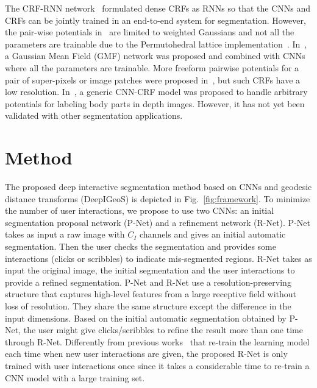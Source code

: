 \documentclass[10pt,journal,compsoc]{IEEEtran}
\begin{document}
The CRF-RNN network~\cite{Zheng2015a} formulated dense CRFs as RNNs so that the CNNs and CRFs can be jointly trained in an end-to-end system for segmentation. However, the pair-wise potentials in~\cite{Zheng2015a} are limited to weighted Gaussians and not all the parameters are trainable due to the Permutohedral lattice implementation~\cite{Adams2010}. In~\cite{Vemulapalli2016}, a Gaussian Mean Field (GMF) network was proposed and combined with CNNs where all the parameters are trainable. More freeform pairwise potentials for a pair of super-pixels or image patches were proposed in~\cite{Liu2014,Lin2016cvpr_efficient}, but such CRFs have a low resolution. In~\cite{Kirillov2016}, a generic CNN-CRF model was proposed to handle arbitrary potentials for labeling body parts in depth images. However, it has not yet been validated with other segmentation applications.


\section{Method}


The proposed deep interactive segmentation method based on CNNs and geodesic distance transforms (DeepIGeoS) is depicted in Fig.~\ref{fig:framework}. To minimize the number of user interactions, we propose to use two CNNs: an initial segmentation proposal network (P-Net) and a refinement network (R-Net). P-Net takes as input a raw image with $C_I$ channels and gives an initial automatic segmentation. Then the user checks the segmentation and provides some interactions (clicks or scribbles) to indicate mis-segmented regions. R-Net takes as input the original image, the initial segmentation and the user interactions to provide a refined segmentation. %
P-Net and R-Net use a resolution-preserving structure that captures high-level features from a large receptive field without loss of resolution. They share the same structure except the difference in the input dimensions. Based on the initial automatic segmentation obtained by P-Net, the user might give clicks/scribbles to refine the result more than one time through R-Net. Differently from previous works~\cite{Wang2016a} that re-train the learning model each time when new user interactions are given, the proposed R-Net is only trained with user interactions once since it takes a considerable time to re-train a CNN model with a large training set.
\end{document}
